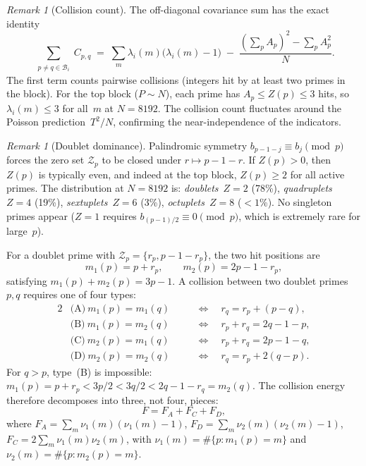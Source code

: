 \documentclass[11pt]{article}
\theoremstyle{definition}
\theoremstyle{remark}
\newtheorem{remark}[theorem]{Remark}
\begin{document}
\begin{remark}[Collision count]
\label{rem:poisson-collision}
The off-diagonal covariance sum has the exact
identity
\[
  \sum_{\substack{p \neq q \in \mathcal{B}_i}}
  C_{p,q}
  \;=\;
  \sum_m \lambda_i(m)\bigl(\lambda_i(m) - 1\bigr)
  \;-\;
  \frac{(\sum_p A_p)^2 - \sum_p A_p^2}{N}.
\]
The first term counts pairwise collisions
(integers hit by at least two primes in the
block).
For the top block ($P \sim N$), each prime has
$A_p \le Z(p) \le 3$ hits, so
$\lambda_i(m) \le 3$ for all~$m$ at $N = 8192$.
The collision count fluctuates around the
Poisson prediction~$T^2/N$,
confirming the near-independence of the
indicators.
\end{remark}

\begin{remark}[Doublet dominance]
\label{rem:doublet}
Palindromic symmetry
$b_{p-1-j} \equiv b_j \pmod{p}$
forces the zero set $\mathcal{Z}_p$
to be closed under $r \mapsto p-1-r$.
If $Z(p) > 0$, then $Z(p)$ is typically
even, and indeed at the top block,
$Z(p) \ge 2$ for all active primes.
The distribution at $N = 8192$ is:
\emph{doublets}~$Z = 2$ (78\%),
\emph{quadruplets}~$Z = 4$ (19\%),
\emph{sextuplets}~$Z = 6$ (3\%),
\emph{octuplets}~$Z = 8$ ($< 1$\%).
No singleton primes appear
($Z = 1$ requires
$b_{(p-1)/2} \equiv 0 \pmod{p}$,
which is extremely rare for large~$p$).

For a doublet prime with
$\mathcal{Z}_p = \{r_p, p - 1 - r_p\}$,
the two hit positions are
\[
  m_1(p) = p + r_p,
  \qquad
  m_2(p) = 2p - 1 - r_p,
\]
satisfying $m_1(p) + m_2(p) = 3p - 1$.
A collision between two doublet primes~$p, q$
requires one of four types:
\begin{alignat*}{2}
  &\text{(A)}\ m_1(p) = m_1(q)
  &\quad&\Longleftrightarrow\quad
  r_q = r_p + (p - q), \\
  &\text{(B)}\ m_1(p) = m_2(q)
  &&\Longleftrightarrow\quad
  r_p + r_q = 2q - 1 - p, \\
  &\text{(C)}\ m_2(p) = m_1(q)
  &&\Longleftrightarrow\quad
  r_p + r_q = 2p - 1 - q, \\
  &\text{(D)}\ m_2(p) = m_2(q)
  &&\Longleftrightarrow\quad
  r_q = r_p + 2(q - p).
\end{alignat*}
For $q > p$, type~(B) is impossible:
$m_1(p) = p + r_p < 3p/2 < 3q/2 < 2q - 1 - r_q = m_2(q)$.
The collision energy therefore decomposes into three,
not four, pieces:
\begin{equation}\label{eq:F-decomp}
  F = F_A + F_C + F_D,
\end{equation}
where $F_A = \sum_m \nu_1(m)(\nu_1(m){-}1)$,
$F_D = \sum_m \nu_2(m)(\nu_2(m){-}1)$,
$F_C = 2\sum_m \nu_1(m)\nu_2(m)$,
with $\nu_1(m) = \#\{p : m_1(p) = m\}$
and $\nu_2(m) = \#\{p : m_2(p) = m\}$.


\end{remark}
\end{document}
